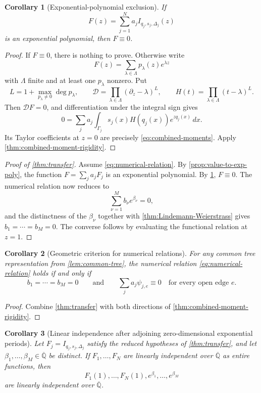 \documentclass[11pt]{article}
\numberwithin{equation}{section}
\newtheorem{corollary}[corollary]{Corollary}
\theoremstyle{definition}
\theoremstyle{remark}
\newcommand{\Qbar}{\overline{\mathbb Q}}
\begin{document}
\begin{corollary}[Exponential-polynomial exclusion]
\label{cor:exp-poly-exclusion}
If
\[
  F(z)=\sum_{j=1}^{N}a_jI_{q_j,s_j,\Delta_j}(z)
\]
is an exponential polynomial, then $F\equiv0$.
\end{corollary}

\begin{proof}
If $F\equiv0$, there is nothing to prove.  Otherwise write
\[
  F(z)=\sum_{\lambda\in\Lambda}p_\lambda(z)e^{\lambda z}
\]
with $\Lambda$ finite and at least one $p_\lambda$ nonzero.  Put
\[
  L=1+\max_{p_\lambda\ne0}\deg p_\lambda,
  \qquad
  \mathscr D=\prod_{\lambda\in\Lambda}(\partial_z-\lambda)^L,
  \qquad
  H(t)=\prod_{\lambda\in\Lambda}(t-\lambda)^L.
\]
Then $\mathscr DF=0$, and differentiation under the integral sign gives
\[
  0=\sum_j a_j\int_{\Gamma_j}
     s_j(x)H(q_j(x))e^{zq_j(x)}\,dx.
\]
Its Taylor coefficients at $z=0$ are precisely
\eqref{eq:combined-moments}.  Apply
\cref{thm:combined-moment-rigidity}.
\end{proof}

\begin{proof}[Proof of \cref{thm:transfer}]
Assume \eqref{eq:numerical-relation}.  By
\cref{prop:value-to-exp-poly}, the function
$F=\sum_j a_jF_j$ is an exponential polynomial.  By
\cref{cor:exp-poly-exclusion}, $F\equiv0$.  The numerical relation now
reduces to
\[
  \sum_{\nu=1}^{M}b_\nu e^{\beta_\nu}=0,
\]
and the distinctness of the $\beta_\nu$ together with
\cref{thm:Lindemann-Weierstrass} gives $b_1=\cdots=b_M=0$.
The converse follows by evaluating the functional relation at $z=1$.
\end{proof}

\begin{corollary}[Geometric criterion for numerical relations]
\label{cor:geometric-criterion}
For any common tree representation from \cref{lem:common-tree}, the
numerical relation \eqref{eq:numerical-relation} holds if and only if
\[
  b_1=\cdots=b_M=0
  \qquad\text{and}\qquad
  \sum_j a_j\psi_{j,e}\equiv0
  \quad\text{for every open edge }e.
\]
\end{corollary}

\begin{proof}
Combine \cref{thm:transfer} with both directions of
\cref{thm:combined-moment-rigidity}.
\end{proof}

\begin{corollary}[Linear independence after adjoining zero-dimensional exponential periods]
\label{cor:independence-with-points}
Let $F_j=I_{q_j,s_j,\Delta_j}$ satisfy the reduced hypotheses of
\cref{thm:transfer}, and let $\beta_1,\ldots,\beta_M\in\Qbar$ be
distinct.  If $F_1,\ldots,F_N$ are linearly independent over $\Qbar$ as
entire functions, then
\[
  F_1(1),\ldots,F_N(1),e^{\beta_1},\ldots,e^{\beta_M}
\]
are linearly independent over $\Qbar$.
\end{corollary}
\end{document}
